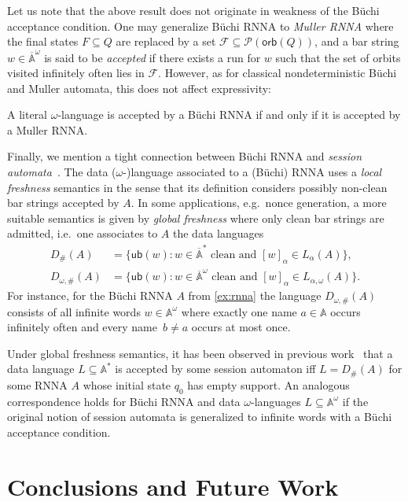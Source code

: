\documentclass[final,a4paper,UKenglish,thm-restate,autoref,numberwithinsect]{lipics-v2021}
\newcommand{\compr}{:}
\newcommand{\F}{\mathcal{F}}
\newcommand{\barA}{\overline{\names}}
\newcommand{\ub}{\mathsf{ub}}
\numberwithin{equation}{section}
\newcommand{\seq}{\subseteq}
\newcommand{\orb}{\mathsf{orb}}
\newcommand{\+}[1]{\mathcal{#1}\xspace}
\newcommand{\Pow}{\mathcal{P}}
\newcommand{\names}{\mathbb{A}}
\theoremstyle{definition}
\begin{document}
Let us note that the above result does not originate in weakness of the Büchi acceptance condition. One may generalize Büchi RNNA to \emph{Muller RNNA} where the final states $F\seq Q$ are replaced
by a set $\F\seq \Pow(\orb(Q))$, and a bar string $w\in \barA^\omega$ is said to be
\emph{accepted} if there exists a run for $w$ such
that the set of orbits visited infinitely often lies in $\F$. However, as for
classical nondeterministic Büchi and Muller automata, this does 
not affect expressivity:
%
\begin{proposition}\label{prop:muller-buchi-equiv}
  A literal $\omega$-language is accepted by a Büchi RNNA if and only
  if it is accepted by a Muller RNNA.
\end{proposition}
%
%
Finally, we mention a tight connection between Büchi RNNA and
\emph{session automata}~\cite{BolligEA14}. The data
($\omega$-)language associated to a (Büchi) RNNA uses a \emph{local
  freshness} semantics in the sense that its definition considers
possibly non-clean bar strings accepted by $A$. In some applications,
e.g.~nonce generation, a more suitable semantics is given by
\emph{global freshness} where only clean bar strings are admitted,
i.e.~one associates to $A$ the data languages
\begin{align*}
  D_{\#}(A)
  &= \{ \ub(w) \compr \text{$w\in \barA^*$ clean and $[w]_\alpha\in
    L_{\alpha}(A)$} \},
  \\
  D_{\omega,\#}(A)
  &= \{ \ub(w) \compr \text{$w\in \barA^\omega$ clean and $[w]_\alpha\in L_{\alpha,\omega}(A)$} \}. 
\end{align*}
For instance, for the Büchi RNNA $A$ from \autoref{ex:rnna} the
language $D_{\omega,\#}(A)$ consists of all infinite words
$w\in \names^\omega$ where exactly one name $a\in \names$ occurs
infinitely often and every name~$b\neq a$ occurs at most once.

Under global freshness semantics, it has been observed in previous
work~\cite{SchroderEA17} that a data language $L\seq \names^*$ is
accepted by some session automaton iff $L=D_{\#}(A)$ for some RNNA $A$
whose initial state $q_0$ has empty support. An analogous correspondence holds for Büchi
RNNA and data $\omega$-languages $L\seq \names^\omega$ if the original
notion of session automata is generalized to infinite words with a
Büchi acceptance condition.
\section{Conclusions and Future Work}
\end{document}
